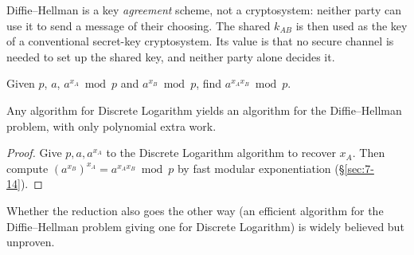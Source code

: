 \begin{note}
Diffie--Hellman is a key \emph{agreement} scheme, not a cryptosystem: neither party can use it to send a message of their choosing. The shared $k_{AB}$ is then used as the key of a conventional secret-key cryptosystem. Its value is that no secure channel is needed to set up the shared key, and neither party alone decides it.
\end{note}

\bigskip
\begin{definition}
Given $p$, $a$, $a^{x_A}\bmod p$ and $a^{x_B}\bmod p$, find $a^{x_Ax_B}\bmod p$.
\end{definition}

\begin{proposition}
\label{thm:dhreduce}
Any algorithm for Discrete Logarithm yields an algorithm for the Diffie--Hellman problem, with only polynomial extra work.
\end{proposition}
\begin{proof}
Give $p,a,a^{x_A}$ to the Discrete Logarithm algorithm to recover $x_A$. Then compute $(a^{x_B})^{x_A}=a^{x_Ax_B}\bmod p$ by fast modular exponentiation (\S\ref{sec:7-14}).
\end{proof}

\begin{note}
Whether the reduction also goes the other way (an efficient algorithm for the Diffie--Hellman problem giving one for Discrete Logarithm) is widely believed but unproven.
\end{note}
